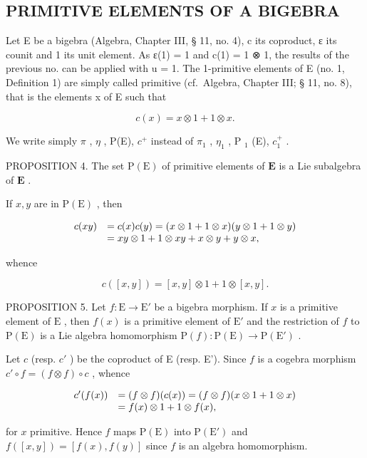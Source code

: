 \subsection{PRIMITIVE ELEMENTS OF A BIGEBRA}

Let E be a bigebra (Algebra, Chapter III, § 11, no. 4), c its coproduct, ε its counit and 1 its unit element. As ε(1) = 1 and c(1) = 1 ⊗ 1, the results of the previous no. can be applied with u = 1. The 1-primitive elements of E (no. 1, Definition 1) are simply called primitive (cf.~Algebra, Chapter III; § 11, no. 8), that is the elements x of E such that

\[
c (x) = x \otimes 1 + 1 \otimes x.\tag{5}
\]

We write simply \(\pi\) , \(\eta\) , P(E), \(c^{+}\) instead of \(\pi_{1}\) , \(\eta_{1}\) , P \(_{1}\) (E), \(c_{1}^{+}\) .

PROPOSITION 4. The set \(\mathrm{P(E)}\) of primitive elements of \(\mathbf{E}\) is a Lie subalgebra of \(\mathbf{E}\) .

If \(x, y\) are in \(\mathrm{P(E)}\) , then

\[
\begin{array}{r l} c (x y) & = c (x) c (y) = (x \otimes 1 + 1 \otimes x) (y \otimes 1 + 1 \otimes y) \\ & = x y \otimes 1 + 1 \otimes x y + x \otimes y + y \otimes x, \end{array}
\]

whence

\[
c ([ x, y ]) = [ x, y ] \otimes 1 + 1 \otimes [ x, y ].
\]

PROPOSITION 5. Let \(f: \mathrm{E} \to \mathrm{E}'\) be a bigebra morphism. If \(x\) is a primitive element of \(\mathrm{E}\) , then \(f(x)\) is a primitive element of \(\mathrm{E}'\) and the restriction of \(f\) to \(\mathrm{P(E)}\) is a Lie algebra homomorphism \(\mathrm{P}(f): \mathrm{P(E)} \to \mathrm{P(E')}\) .

Let \(c\) (resp. \(c'\) ) be the coproduct of E (resp. E'). Since \(f\) is a cogebra morphism \(c' \circ f = (f \otimes f) \circ c\) , whence

\[
\begin{array}{r l} c ^ {\prime} (f (x)) & = (f \otimes f) (c (x)) = (f \otimes f) (x \otimes 1 + 1 \otimes x) \\ & = f (x) \otimes 1 + 1 \otimes f (x), \end{array}
\]

for \(x\) primitive. Hence \(f\) maps \(\mathrm{P(E)}\) into \(\mathrm{P(E')}\) and \(f([x,y]) = [f(x),f(y)]\) since \(f\) is an algebra homomorphism.

